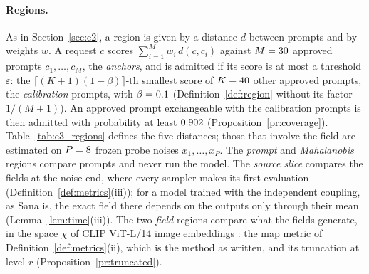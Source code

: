 \documentclass{article}
\theoremstyle{plain}
\theoremstyle{remark}
\begin{document}
\paragraph{Regions.}
As in Section~\ref{sec:e2}, a region is given by a distance $d$ between prompts and by weights $w$. A request $c$ scores
$\sum_{i=1}^Mw_i\,d(c,c_i)$ against $M=30$ approved prompts $c_1,\dots,c_M$, the \emph{anchors}, and is admitted if its score
is at most a threshold $\varepsilon$: the $\lceil(K+1)(1-\beta)\rceil$-th smallest score of $K=40$ other approved prompts, the
\emph{calibration} prompts, with $\beta=0.1$ (Definition~\ref{def:region} without its factor $1/(M+1)$). An approved prompt
exchangeable with the calibration prompts is then admitted with probability at least $0.902$ (Proposition~\ref{pr:coverage}).
Table~\ref{tab:e3_regions} defines the five distances; those that involve the field are estimated on $P=8$ frozen probe noises
$x_1,\dots,x_P$. The \emph{prompt} and \emph{Mahalanobis} regions compare prompts and never run the model. The \emph{source slice}
compares the fields at the noise end, where every sampler makes its first evaluation (Definition~\ref{def:metrics}(iii)); for a
model trained with the independent coupling, as Sana is, the exact field there depends on the outputs only through their mean
(Lemma~\ref{lem:time}(iii)). The two \emph{field} regions compare what the fields generate, in the space $\chi$ of CLIP ViT-L/14
image embeddings \citep{radford2021learning}: the map metric of Definition~\ref{def:metrics}(ii), which is the method as written,
and its truncation at level $r$ (Proposition~\ref{pr:truncated}).
\end{document}
